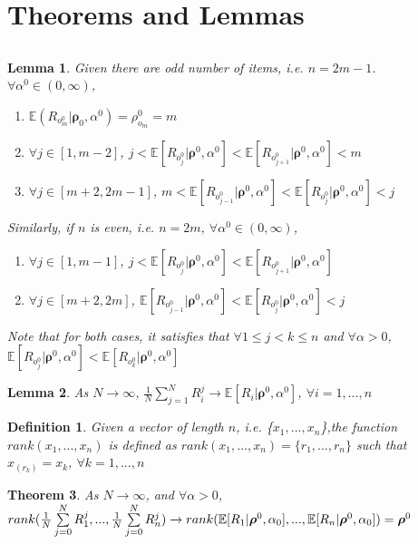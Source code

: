 \documentclass[11pt, oneside]{article}   	%
\newtheorem{theorem}{Theorem}[subsection]
\newtheorem{lemma}[theorem]{Lemma}
\newtheorem{mydef}{Definition}
\begin{document}
\section{Theorems and Lemmas}
\subsection{ }
\begin{lemma} \label{lem:nocross}
Given there are odd number of items, i.e. $n = 2m - 1$. $\forall \alpha^0 \in (0, \infty)$,

	\begin{enumerate} 
		\item{$\mathbb{E}(R_{o^0_m}|\bm{\rho}_{0}, \alpha^0) = \rho^0_{o_m} = m$ }
		\item{$\forall j \in [1, m-2]$, $j< \mathbb{E}[R_{o^0_j}|\bm{\rho}^0, \alpha^0] <\mathbb{E}[R_{o^0_{j+1}}|\bm{\rho}^0, \alpha^0] < m$}
		\item{$\forall j \in [m+2, 2m-1]$, $m< \mathbb{E}[R_{o^0_{j-1}}|\bm{\rho}^0, \alpha^0] <\mathbb{E}[R_{o^0_{j}}|\bm{\rho}^0, \alpha^0] < j$}
	\end{enumerate}
Similarly, if $n$ is even, i.e. $n = 2m$,  $\forall \alpha^0 \in (0, \infty)$,
	\begin{enumerate} 
	\item{$\forall j \in [1, m-1]$, $j< \mathbb{E}[R_{o^0_j}|\bm{\rho}^0, \alpha^0] <\mathbb{E}[R_{o^0_{j+1}}|\bm{\rho}^0, \alpha^0]$}
	\item{$\forall j \in [m+2, 2m]$, $\mathbb{E}[R_{o^0_{j-1}}|\bm{\rho}^0, \alpha^0] <\mathbb{E}[R_{o^0_{j}}|\bm{\rho}^0, \alpha^0] < j$}
\end{enumerate}
Note that for both cases, it satisfies that $\forall 1\leq j<k\leq n$ and $\forall \alpha > 0 $,
{$\mathbb{E}[R_{o^0_j}|\bm{\rho}^0, \alpha^0]<\mathbb{E}[R_{o^0_k}|\bm{\rho}^0, \alpha^0]$}
\end{lemma}

\begin{lemma}\label{lem:largenumbers}
 As $N \rightarrow \infty$, $\frac{1}{N}\sum\limits_{j=1}^{N}R^j_i \rightarrow \mathbb{E}[R_i|\bm{\rho}^0, \alpha ^0]$, $\forall i = 1, ..., n$
\end{lemma}

\begin{mydef}
Given a vector of length $n$, i.e. \{$x_1, ..., x_n$\},the function $rank(x_1, ..., x_n)$ is defined as $rank(x_1, ..., x_n) = \{r_1, ..., r_n\}$ such that $x_{(r_k)} = x_k$, $\forall k = 1, ..., n$
\end{mydef} 
\begin{theorem}\label{theorem:inferrho}
As $N \rightarrow \infty$, and $\forall \alpha > 0$, \\ $rank({1\over N}\sum\limits_{j=0}^{N}R_1^j,...,{1\over N}\sum\limits_{j=0}^{N}R_n^j) \rightarrow rank(\mathbb{E}[{R}_1|\bm{\rho}^0, \alpha_0],...,\mathbb{E}[{R}_n|\bm{\rho}^0, \alpha_0]) =\bm{\rho}^0 $
\end{theorem}
\end{document}

